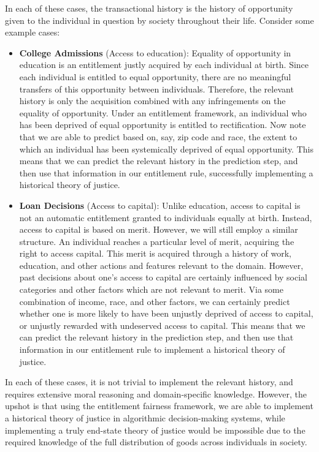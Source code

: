In each of these cases, the transactional history is the history of opportunity
given to the individual in question by society throughout their life. Consider
some example cases:
\begin{itemize}
    \item \textbf{College Admissions} (Access to education): Equality of
          opportunity in education is an entitlement justly acquired by each
          individual at birth. Since each individual is entitled to equal
          opportunity, there are no meaningful transfers of this opportunity
          between individuals. Therefore, the relevant history is only the
          acquisition combined with any infringements on the equality of
          opportunity. Under an entitlement framework, an individual who has
          been deprived of equal opportunity is entitled to rectification. Now
          note that we are able to predict based on, say, zip code and race,
          the extent to which an individual has been systemically deprived of
          equal opportunity. This means that we can predict the relevant history
          in the prediction step, and then use that information in our
          entitlement rule, successfully implementing a historical theory of
          justice.
    \item \textbf{Loan Decisions} (Access to capital): Unlike education, access
          to capital is not an automatic entitlement granted to individuals
          equally at birth. Instead, access to capital is based on merit.
          However, we will still employ a similar structure. An individual
          reaches a particular level of merit, acquiring the right to access
          capital. This merit is acquired through a history of work, education,
          and other actions and features relevant to the domain. However, past
          decisions about one's access to capital are certainly influenced by
          social categories and other factors which are not relevant to merit.
          Via some combination of income, race, and other factors, we can
          certainly predict whether one is more likely to have been unjustly
          deprived of access to capital, or unjustly rewarded with undeserved
          access to capital. This means that we can predict the relevant history
          in the prediction step, and then use that information in our
          entitlement rule to implement a historical theory of justice.
\end{itemize}

In each of these cases, it is not trivial to implement the relevant history, and
requires extensive moral reasoning and domain-specific knowledge. However, the
upshot is that using the entitlement fairness framework, we are able to implement
a historical theory of justice in algorithmic decision-making systems, while 
implementing a truly end-state theory of justice would be impossible due to the
required knowledge of the full distribution of goods across individuals in society.

